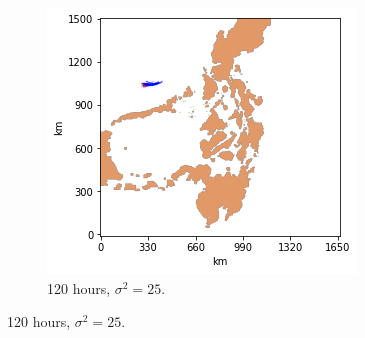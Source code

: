 \documentclass[11pt, english]{article}
\begin{document}
\begin{multicols}{2}
\begin{figure}
\begin{subfigure}{0.33\textwidth}
	\end{subfigure}
	\begin{subfigure}{0.33\textwidth}
		\centering
		\caption{120 hours, $\sigma^{2} = 25$.}
		\label{fig:toy-120-25}
		\includegraphics[width=\textwidth]{toy-120-25}
	\end{subfigure}\vspace{2ex}
	

\end{figure}
\end{multicols}
\end{document}
